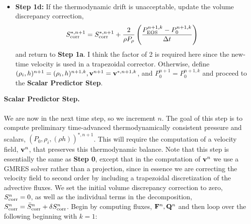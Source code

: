 \documentclass[final]{siamltex}
\def\Fb {{\bf F}}
\def\Qb {{\bf Q}}
\def\vb {{\bf v}}
\begin{document}
\begin{itemize}
\begin{eqnarray}
\end{eqnarray}
\item {\bf Step 1d:} If the thermodynamic drift is unacceptable, update the volume 
discrepancy correction,
\begin{equation}
S_{\rm corr}^{*,n+1} = S_{\rm corr}^{*,n+1} + \frac{2}{\rho P_\rho}\left(\frac{P_{\rm EOS}^{n+1,k} - P_0^{n+1,k}}{\Delta t}\right)
\end{equation}
and return to {\bf Step 1a}.  I think the factor of 2 is required here since the new-time
velocity is used in a trapezoidal corrector.  Otherwise, define 
$(\rho_i,h)^{n+1} = (\rho_i,h)^{n+1,k}, \vb^{n+1} = \vb^{*,n+1,k}$, and 
$P_0^{n+1} = P_0^{n+1,k}$ and proceed to the {\bf Scalar Predictor Step}.\\
\end{itemize}
{\bf Scalar Predictor Step.}\\ \\
We are now in the next time step, so we increment $n$.
The goal of this step is to compute preliminary time-advanced thermodynamically
consistent pressure and scalars, $(P_0,\rho_i,(\rho h))^{*,n+1}$.  This will
require the computation of a velocity field, $\vb^n$, that preserves this
thermodynamic balance.  Note that this step is essentially the same as
{\bf Step 0}, except that in the computation of $\vb^n$ we use a GMRES
solver rather than a projection, since in essence we are correcting the velocity
field to second order by including a trapezoidal discretization of the advective fluxes.
We set the initial volume discrepancy correction to zero, 
$S_{\rm corr}^n = 0$, as well as the individual terms in the decomposition,
$S_{\rm corr}^n = \bar{S}_{\rm corr}^n + \delta S_{\rm corr}^n$.
Begin by computing fluxes, $\Fb^n, \Qb^n$ and then
loop over the following beginning with $k=1$:\\
\end{document}
